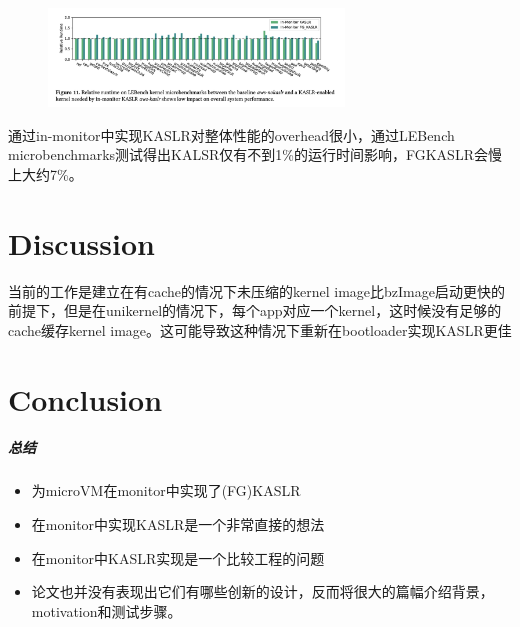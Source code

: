 \documentclass[
    aspectratio=169,  %
]{ctexbeamer}
\begin{document}
\begin{frame}

\begin{figure}
	\centering
	\includegraphics[width=0.7\textwidth]{img/lebench.png}
\end{figure}

通过in-monitor中实现KASLR对整体性能的overhead很小，通过LEBench microbenchmarks测试得出KALSR仅有不到1\%的运行时间影响，FGKASLR会慢上大约7\%。

\end{frame}

\part{Discussion}

\begin{frame}
当前的工作是建立在有cache的情况下未压缩的kernel image比bzImage启动更快的前提下，但是在unikernel的情况下，每个app对应一个kernel，这时候没有足够的cache缓存kernel image。这可能导致这种情况下重新在bootloader实现KASLR更佳
\end{frame}

\part{Conclusion}

\begin{frame}
  \frametitle{总结}
  \begin{itemize}
    \item 为microVM在monitor中实现了(FG)KASLR
    \item 在monitor中实现KASLR是一个非常直接的想法
    \item 在monitor中KASLR实现是一个比较工程的问题
    \item 论文也并没有表现出它们有哪些创新的设计，反而将很大的篇幅介绍背景，motivation和测试步骤。
  \end{itemize}
\end{frame}
\end{document}
